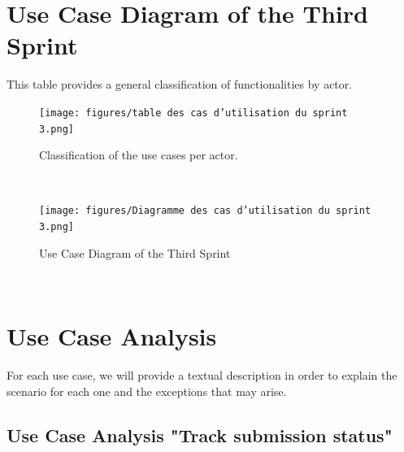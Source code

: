\section{Use Case Diagram of the Third Sprint}
This table provides a general classification of functionalities by actor.
 \begin{figure}[h]
    \centering
    \texttt{[image: figures/table des cas d’utilisation du sprint 3.png]}
    \caption{Classification of the use cases per actor.}
\end{figure}\
\clearpage
\begin{figure}[h!]
    \centering
    \texttt{[image: figures/Diagramme des cas d’utilisation du sprint 3.png]}
    \caption{Use Case Diagram of the Third Sprint}
\end{figure}\
\section{Use Case Analysis}
For each use case, we will provide a textual description in order to explain the scenario for each one and the exceptions that may arise.
\subsection{Use Case Analysis "Track submission status"}
